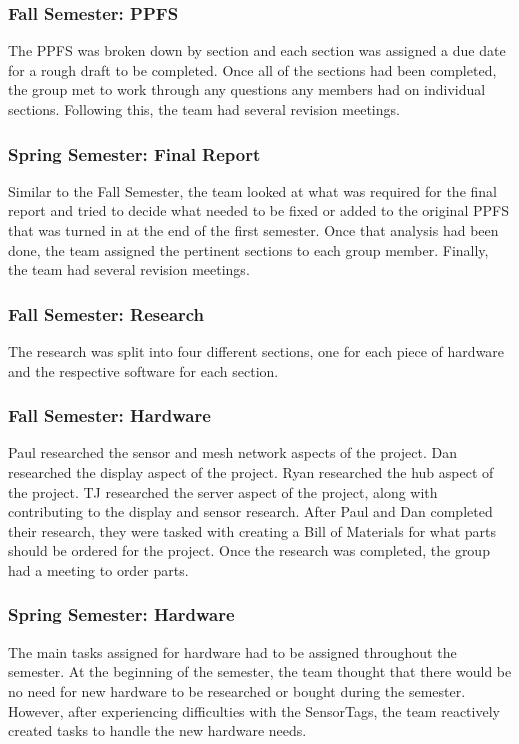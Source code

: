 \documentclass[PPFS.tex]{template/subfiles}
\begin{document}
\subsubsection{Fall Semester: PPFS}
The PPFS was broken down by section and each section was assigned a due date for a rough draft to be completed. Once all of the sections had been completed, the group met to work through any questions any members had on individual sections. Following this, the team had several revision meetings.

\subsubsection{Spring Semester: Final Report}
Similar to the Fall Semester, the team looked at what was required for the final report and tried to decide what needed to be fixed or added to the original PPFS that was turned in at the end of the first semester. Once that analysis had been done, the team assigned the pertinent sections to each group member. Finally, the team had several revision meetings.

\subsubsection{Fall Semester: Research}
The research was split into four different sections, one for each piece of hardware and the respective software for each section.

\subsubsection{Fall Semester: Hardware}
Paul researched the sensor and mesh network aspects of the project. Dan researched the display aspect of the project. Ryan researched the hub aspect of the project. TJ researched the server aspect of the project, along with contributing to the display and sensor research. After Paul and Dan completed their research, they were tasked with creating a Bill of Materials for what parts should be ordered for the project. Once the research was completed, the group had a meeting to order parts.

\subsubsection{Spring Semester: Hardware}
The main tasks assigned for hardware had to be assigned throughout the semester. At the beginning of the semester, the team thought that there would be no need for new hardware to be researched or bought during the semester. However, after experiencing difficulties with the SensorTags, the team reactively created tasks to handle the new hardware needs.
\end{document}
